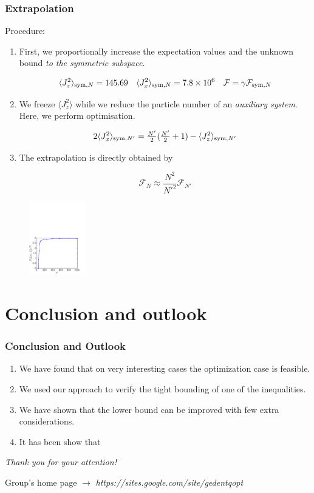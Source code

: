 \documentclass{beamer}
\newcommand{\expect}[1]{\ensuremath{\langle #1 \rangle}}
\begin{document}
		\begin{frame}
			\frametitle{Extrapolation}
			Procedure:
			\begin{enumerate}
				\item<1-> First, we proportionally increase the expectation values and the unknown bound \emph{to the symmetric subspace}.
				\begin{block}
					{}
					\[ \expect{J_z^2}_{{\rm sym},N} = 145.69 \quad \expect{J_x^2}_{{\rm sym},N} = 7.8 \times 10^6 \quad
					 \mathcal{F} = \gamma \mathcal{F}_{{\rm sym},N}
					\]
				\end{block}
				\item<2-> We freeze $\expect{J_z^2}$ while we reduce the particle number of an \emph{\color{blue}auxiliary system}. Here, we perform optimisation.
				\begin{block}
					{}
					\[ 2\expect{J_x^2}_{{\rm sym},N'} = \tfrac{N'}{2}(\tfrac{N'}{2}+1)- \expect{J_z^2}_{{\rm sym},N'} \]
				\end{block}
				\item<3-> The extrapolation is directly obtained by
				\begin{block}
					{}
					\[ \mathcal{F}_N \approx \frac{N^2}{N'^2} \mathcal{F}_{N'}
					\]
				\end{block}
			\end{enumerate}
		\end{frame}

		\begin{frame}

			\begin{figure}
				\includegraphics[height=120px]{img/asymptoticapproach-dicke.pdf}
			\end{figure}

		\end{frame}

\section{Conclusion and outlook}

	\begin{frame}
		\frametitle{Conclusion and Outlook}
		\begin{enumerate}
			\item<1-> We have found that on very interesting cases the optimization case is feasible.
			\item<2-> We used our approach to verify the tight bounding of one of the inequalities.
			\item<3-> We have shown that the lower bound can be improved with few extra considerations.
			\item<4-> It has been show that
		\end{enumerate}

	\end{frame}

	\begin{frame}
		\emph{\Large Thank you for your attention!}

		\vspace{5px}
		Group's home page $\rightarrow$ \emph{\color{blue} https://sites.google.com/site/gedentqopt}

	\end{frame}
\end{document}
